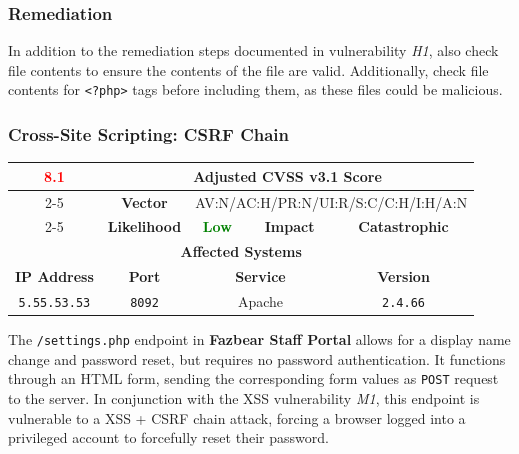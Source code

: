\documentclass[12pt, letterpaper]{article}
\begin{document}
\subsubsection*{Remediation}

In addition to the remediation steps documented in vulnerability
\textit{H1}, also check file contents to ensure the contents of the
file are valid. Additionally, check file contents for \texttt{<?php>}
tags before including them, as these files could be malicious.

\clearpage
\subsubsection{Cross-Site Scripting: CSRF Chain}

\begin{table}[!ht]
  \centering
  \renewcommand{\arraystretch}{1.8} %
  \begin{tabular}{|c|c|c|c|c|}
    \hline
    \multirow{3}{*}{\textcolor{red}{\textbf{\huge 8.1}}} &
    \multicolumn{4}{c|}{\textbf{Adjusted CVSS v3.1 Score}} \\ \cline{2-5}
    & \textbf{Vector} &
    \multicolumn{3}{c|}{AV:N/AC:H/PR:N/UI:R/S:C/C:H/I:H/A:N} \\ \cline{2-5}
    & \textbf{Likelihood} & \textcolor{green}{\textbf{Low}}
    & \textbf{Impact} & \textcolor{RoyalPurple}{\textbf{Catastrophic}} \\ \hline
    \multicolumn{5}{|c|}{\textbf{Affected Systems}} \\ \hline
    \textbf{IP Address} & \textbf{Port} &
    \multicolumn{2}{c|}{\textbf{Service}} & \textbf{Version} \\ \hline
    \texttt{5.55.53.53} & \texttt{8092} & \multicolumn{2}{c|}{Apache}
    & \texttt{2.4.66} \\ \hline
  \end{tabular}
\end{table}
\FloatBarrier

The \texttt{/settings.php} endpoint in \textbf{Fazbear Staff Portal}
allows for a display name change and password reset, but requires no
password authentication. It functions through an HTML form, sending
the corresponding form values as \texttt{POST} request to the server.
In conjunction with the XSS vulnerability \textit{M1}, this endpoint
is vulnerable to a XSS + CSRF chain attack, forcing a browser logged
into a privileged account to forcefully reset their password.
\end{document}
